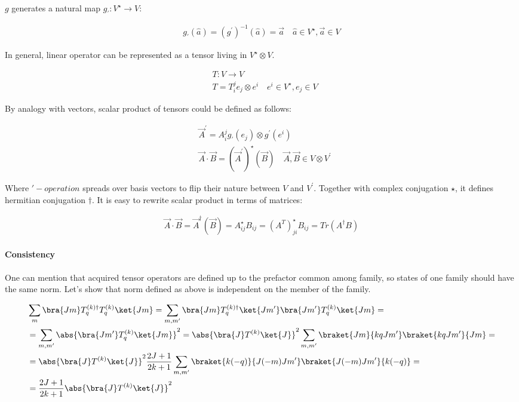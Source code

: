 $g$ generates a natural map $g_\prime: V^\star \rightarrow V$:

\begin{align}
    g_\prime(\hat{a}) = (g^\prime)^{-1}(\hat{a}) = \vec{a} \quad \hat{a} \in V^\star, \vec{a} \in V
\end{align}

In general, linear operator can be represented as a tensor
living in $V^\star \otimes V$.

\begin{align}
        &T: V \rightarrow V \\
        &T = T_i^j e_j \otimes e^i \quad e^i \in V^\star, e_j \in V 
\end{align}

By analogy with vectors, scalar product of tensors could be defined as follows:

\begin{align}
        &\vec{A}^\prime = A_i^j g_\prime(e_j) \otimes g^\prime(e^i) \\ 
        &\vec{A} \cdot \vec{B} = (\vec{A}^\prime)^\star(\vec{B}) \quad \vec{A}, \vec{B} \in V \otimes V^\prime
\end{align}

Where $\prime-operation$ spreads over basis vectors to flip their nature
between $V$ and $V^\prime$. Together with complex conjugation $\star$, it
defines hermitian conjugation $\dagger$. It is easy to rewrite
scalar product in terms of matrices:

\begin{align}
    \vec{A} \cdot \vec{B} = \vec{A}^\dagger (\vec{B}) = A_{ij}^\star B_{ij} = (A^T)^\star_{j i} B_{ij} = Tr(A^\dagger B)
\end{align}

\paragraph{Consistency}

One can mention that acquired tensor operators are defined up to the prefactor common among family, so states of one family should have the same norm. Let's show that norm defined as above is independent on the member of the family.

\begin{align}
    &\sum_m \bra{J m} T^{(k) \dag}_q T^{(k)}_q \ket{J m} = \sum_{m, m^\prime} \bra{J m} T^{(k) \dag}_q \ket{J m^\prime}\bra{J m^\prime} T^{(k)}_q \ket{J m} = \\
    &=  \sum_{m, m^\prime} \abs{ \bra{J m^\prime} T^{(k)}_q \ket{J m} }^2 = \abs{\bra{J} T^{(k) }\ket{J}}^2 \sum_{m, m^\prime} \braket{J m}{k q J m^\prime} \braket{k q J m^\prime}{J m} = \\
    &= \abs{\bra{J} T^{(k) }\ket{J}}^2 \frac{2J+1}{2k + 1} \sum_{m, m^\prime} \braket{k (-q)}{J (-m) J m^\prime} \braket{J (-m) J m^\prime}{k (-q)} = \\
    &= \frac{2J+1}{2k + 1} \abs{\bra{J} T^{(k) }\ket{J}}^2
\end{align}
